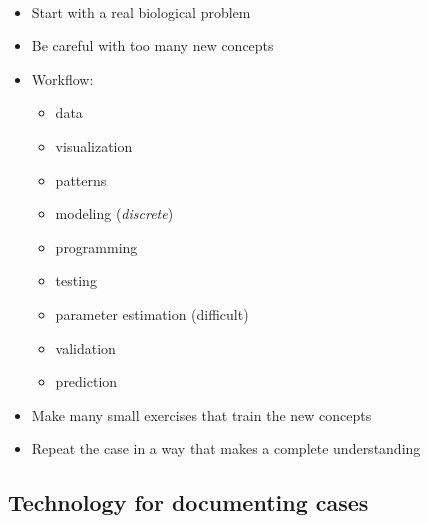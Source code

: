 \documentclass[%
twoside,                 %
final,                   %
10pt]{article}
\begin{document}
\paragraph{}
\begin{itemize}
 \item Start with a real biological problem

 \item Be careful with too many new concepts

 \item Workflow:
\begin{itemize}

  \item data

  \item visualization

  \item patterns

  \item modeling (\emph{discrete})

  \item programming

  \item testing

  \item parameter estimation (difficult)

  \item validation

  \item prediction

\end{itemize}

\noindent
 \item Make many small exercises that train the new concepts

 \item Repeat the case in a way that makes a complete understanding
\end{itemize}

\noindent



\subsection{Technology for documenting cases}


\end{document}
